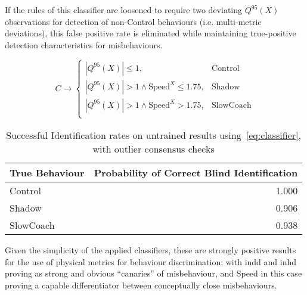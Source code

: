 If the rules of this classifier are loosened to require two deviating $Q^{95}(X)$ observations for detection of non-Control behaviours (i.e. multi-metric deviations), this false positive rate is eliminated while maintaining true-positive detection characteristics for misbehaviours.

\begin{equation}
C \rightarrow 
\begin{cases}
|Q^{95}(X)| \leq 1,& \text{Control}\\
|Q^{95}(X)| > 1 \land \text{Speed}^X \leq 1.75, & \text{Shadow}\\
|Q^{95}(X)| > 1 \land \text{Speed}^X > 1.75,& \text{SlowCoach}\\
\end{cases}
\label{eq:classifier_minority}
\end{equation}
\begin{table}[h]
  \caption{Successful Identification rates on untrained results using~\autoref{eq:classifier}, with outlier consensus checks}
  \centering
  \begin{tabular}{lr}
  	\toprule
  	True Behaviour &  Probability of Correct Blind Identification \\
  	\midrule
  	Control        &                                        1.000 \\
  	Shadow         &                                        0.906 \\
  	SlowCoach      &                                        0.938 \\
  	\bottomrule
  \end{tabular}
  \label{tab:classifier_minority}
\end{table}

Given the simplicity of the applied classifiers, these are strongly positive results for the use of physical metrics for behaviour discrimination; with \gls{indd} and \gls{inhd} proving as strong and obvious ``canaries'' of misbehaviour, and Speed in this case proving a capable differentiator between conceptually close misbehaviours.


